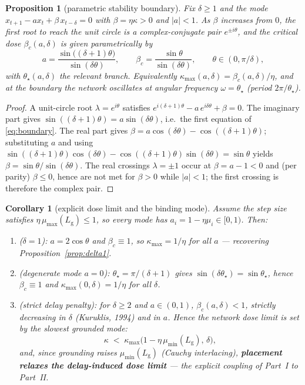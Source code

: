 \documentclass[11pt]{article}
\newtheorem{proposition}{Proposition}
\newtheorem{corollary}{Corollary}
\theoremstyle{definition}
\newcommand{\Lg}{L_{\mathrm g}}
\begin{document}
\begin{proposition}[parametric stability boundary]\label{prop:boundary}
Fix $\delta\ge1$ and the mode $x_{t+1}-a x_t+\beta\,x_{t-\delta}=0$ with $\beta=\eta\kappa>0$ and
$|a|<1$. As $\beta$ increases from $0$, the first root to reach the unit circle is a
complex-conjugate pair $e^{\pm i\theta}$, and the critical dose $\beta_c(a,\delta)$ is given
parametrically by
\begin{equation}\label{eq:boundary}
  a=\frac{\sin\big((\delta+1)\theta\big)}{\sin(\delta\theta)},\qquad
  \beta_c=\frac{\sin\theta}{\sin(\delta\theta)},\qquad \theta\in(0,\pi/\delta),
\end{equation}
with $\theta_\star(a,\delta)$ the relevant branch. Equivalently
$\kappa_{\max}(a,\delta)=\beta_c(a,\delta)/\eta$, and at the boundary the network oscillates at
angular frequency $\omega=\theta_\star$ (period $2\pi/\theta_\star$).
\end{proposition}
\begin{proof}
A unit-circle root $\lambda=e^{i\theta}$ satisfies
$e^{i(\delta+1)\theta}-a\,e^{i\delta\theta}+\beta=0$. The imaginary part gives
$\sin((\delta+1)\theta)=a\sin(\delta\theta)$, i.e.\ the first equation of \eqref{eq:boundary}.
The real part gives $\beta=a\cos(\delta\theta)-\cos((\delta+1)\theta)$; substituting $a$ and using
$\sin((\delta+1)\theta)\cos(\delta\theta)-\cos((\delta+1)\theta)\sin(\delta\theta)=\sin\theta$
yields $\beta=\sin\theta/\sin(\delta\theta)$. The real crossings $\lambda=\pm1$ occur at
$\beta=a-1<0$ and (per parity) $\beta\le 0$, hence are not met for $\beta>0$ while $|a|<1$; the
first crossing is therefore the complex pair.
\end{proof}

\begin{corollary}[explicit dose limit and the binding mode]\label{cor:dose-explicit}
Assume the step size satisfies $\eta\,\mu_{\max}(\Lg)\le1$, so every mode has
$a_i=1-\eta\mu_i\in[0,1)$. Then:
\begin{enumerate}
  \item \emph{($\delta=1$):} $a=2\cos\theta$ and $\beta_c\equiv1$, so $\kappa_{\max}=1/\eta$ for
        all $a$ --- recovering Proposition~\ref{prop:delta1}.
  \item \emph{(degenerate mode $a=0$):} $\theta_\star=\pi/(\delta+1)$ gives
        $\sin(\delta\theta_\star)=\sin\theta_\star$, hence $\beta_c\equiv1$ and
        $\kappa_{\max}(0,\delta)=1/\eta$ for all $\delta$.
  \item \emph{(strict delay penalty):} for $\delta\ge2$ and $a\in(0,1)$, $\beta_c(a,\delta)<1$,
        strictly decreasing in $\delta$ (Kuruklis, 1994) and in $a$. Hence the network dose limit
        is set by the \emph{slowest grounded mode}:
        \[
          \kappa \;<\; \kappa_{\max}\!\big(1-\eta\,\mu_{\min}(\Lg),\,\delta\big),
        \]
        and, since grounding raises $\mu_{\min}(\Lg)$ (Cauchy interlacing), \textbf{placement
        relaxes the delay-induced dose limit} --- the explicit coupling of Part~I to Part~II.
\end{enumerate}
\end{corollary}
\end{document}
